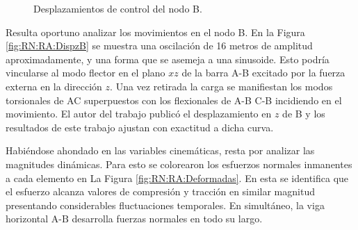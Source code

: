 \begingroup
\centering
\begin{figure}[htbp]
	\centering
	\caption{Desplazamientos de control del nodo B.} \label{fig:RN:RA:DispsB}
\end{figure}
\endgroup

Resulta oportuno analizar los movimientos en el nodo B. En la Figura \ref{fig:RN:RA:DispzB} se muestra una oscilación de 16 metros de amplitud aproximadamente, y una forma que se asemeja a una sinusoide. Esto podría vincularse al modo flector en el plano $xz$ de la barra A-B excitado por la fuerza externa en la dirección $z$. Una vez retirada la carga se manifiestan los modos torsionales de AC superpuestos con los flexionales de A-B C-B incidiendo en el movimiento. El autor del trabajo \textcite{Le2014} publicó el desplazamiento en $z$ de B y los resultados de este trabajo ajustan con exactitud a dicha curva. 

Habiéndose ahondado en las variables cinemáticas, resta por analizar las magnitudes dinámicas. Para esto se colorearon los esfuerzos normales inmanentes a cada elemento en La Figura \ref{fig:RN:RA:Deformadas}. En esta se identifica que el esfuerzo alcanza valores de compresión y tracción en similar magnitud presentando considerables fluctuaciones temporales. En simultáneo, la viga horizontal $\text{A-B}$ desarrolla fuerzas normales en todo su largo. 

